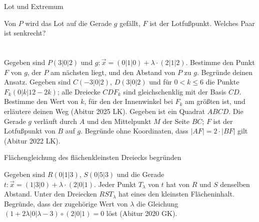\setcounter{aufgabe}{17}

\begin{aufgabe}{Lot und Extremum}
\begin{teile}
\teil Von $P$ wird das Lot auf die Gerade $g$ gefällt, $F$ ist der Lotfußpunkt. Welches Paar ist senkrecht? \\  \\  \\ 
\teil Gegeben sind $P(3 | 0 | 2)$ und $g\colon \vec x = (0 | 1 | 0) + \lambda \cdot (2 | 1 | 2)$. Bestimme den Punkt $F$ von $g$, der $P$ am nächsten liegt, und den Abstand von $P$ zu $g$. Begründe deinen Ansatz.
\teil Gegeben sind $C(-3 | 0 | 2)$, $D(3 | 0 | 2)$ und für $0 < k \le 6$ die Punkte $F_k(0 | k | 12 - 2k)$; alle Dreiecke $CDF_k$ sind gleichschenklig mit der Basis $CD$. Bestimme den Wert von $k$, für den der Innenwinkel bei $F_k$ am größten ist, und erläutere deinen Weg \hfill (Abitur 2025 LK).
\teil Gegeben ist ein Quadrat $ABCD$. Die Gerade $g$ verläuft durch $A$ und den Mittelpunkt $M$ der Seite $BC$; $F$ ist der Lotfußpunkt von $B$ auf $g$. Begründe ohne Koordinaten, dass $|AF| = 2 \cdot |BF|$ gilt \hfill (Abitur 2022 LK).
\end{teile}
\end{aufgabe}

\begin{aufgabe}{Flächengleichung des flächenkleinsten Dreiecks begründen}
\begin{teile}
\teil Gegeben sind $R(0 | 1 | 3)$, $S(0 | 5 | 3)$ und die Gerade $t\colon \vec x = (1 | 3 | 0) + \lambda \cdot (2 | 0 | 1)$. Jeder Punkt $T_\lambda$ von $t$ hat von $R$ und $S$ denselben Abstand. Unter den Dreiecken $RST_\lambda$ hat eines den kleinsten Flächeninhalt. Begründe, dass der zugehörige Wert von $\lambda$ die Gleichung $(1 + 2\lambda | 0 | \lambda - 3) \circ (2 | 0 | 1) = 0$ löst \hfill (Abitur 2020 GK).
\end{teile}
\end{aufgabe}

